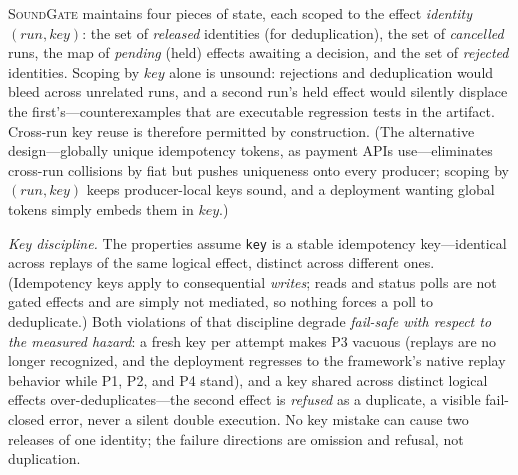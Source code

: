\documentclass[10pt,journal,compsoc]{IEEEtran}
\newcommand{\sys}{\textsc{SoundGate}}
\begin{document}
\sys{} maintains four pieces of state, each scoped to the effect
\emph{identity} $(\mathit{run},\mathit{key})$: the set of \emph{released}
identities (for deduplication), the set of \emph{cancelled} runs, the map of
\emph{pending} (held) effects awaiting a decision, and the set of
\emph{rejected} identities. Scoping by $\mathit{key}$ alone is unsound:
rejections and deduplication would bleed across unrelated runs, and a second
run's held effect would silently displace the first's---counterexamples that
are executable regression tests in the artifact. Cross-run key reuse is
therefore permitted by construction. (The alternative design---globally unique
idempotency tokens, as payment APIs use---eliminates cross-run collisions by
fiat but pushes uniqueness onto every producer; scoping by
$(\mathit{run},\mathit{key})$ keeps producer-local keys sound, and a deployment
wanting global tokens simply embeds them in $\mathit{key}$.)

\emph{Key discipline.} The properties assume \texttt{key} is a stable
idempotency key---identical across replays of the same logical effect,
distinct across different ones. (Idempotency keys apply to consequential
\emph{writes}; reads and status polls are not gated effects and are simply
not mediated, so nothing forces a poll to deduplicate.) Both violations of
that discipline degrade
\emph{fail-safe with respect to the measured hazard}: a fresh key per attempt
makes P3 vacuous (replays are no longer recognized, and the deployment
regresses to the framework's native replay behavior while P1, P2, and P4
stand), and a key shared across distinct logical effects
over-deduplicates---the second effect is \emph{refused} as a duplicate, a
visible fail-closed error, never a silent double execution. No key mistake
can cause two releases of one identity; the failure directions are omission
and refusal, not duplication.
\end{document}
